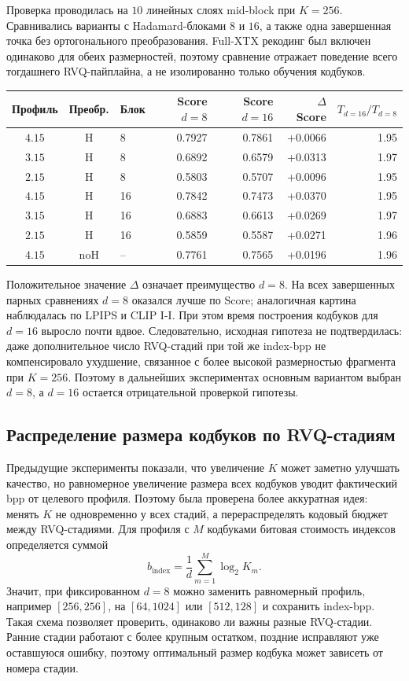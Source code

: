 \documentclass[a4paper,12pt]{article}
\begin{document}
Проверка проводилась на $10$ линейных слоях mid-block при $K=256$. Сравнивались варианты с Hadamard-блоками $8$ и $16$, а также одна завершенная точка без ортогонального преобразования. Full-XTX рекодинг был включен одинаково для обеих размерностей, поэтому сравнение отражает поведение всего тогдашнего RVQ-пайплайна, а не изолированно только обучения кодбуков.

\begin{center}
\small
\begin{tabular}{cclrrrr}
\hline
Профиль & Преобр. & Блок & Score $d=8$ & Score $d=16$ & $\Delta$ Score & $T_{d=16}/T_{d=8}$ \\
\hline
$4.15$ & H & 8  & 0.7927 & 0.7861 & +0.0066 & 1.95 \\
$3.15$ & H & 8  & 0.6892 & 0.6579 & +0.0313 & 1.97 \\
$2.15$ & H & 8  & 0.5803 & 0.5707 & +0.0096 & 1.95 \\
$4.15$ & H & 16 & 0.7842 & 0.7473 & +0.0370 & 1.95 \\
$3.15$ & H & 16 & 0.6883 & 0.6613 & +0.0269 & 1.97 \\
$2.15$ & H & 16 & 0.5859 & 0.5587 & +0.0271 & 1.96 \\
$4.15$ & noH & -- & 0.7761 & 0.7565 & +0.0196 & 1.96 \\
\hline
\end{tabular}
\end{center}

Положительное значение $\Delta$ означает преимущество $d=8$. На всех завершенных парных сравнениях $d=8$ оказался лучше по Score; аналогичная картина наблюдалась по LPIPS и CLIP I-I. При этом время построения кодбуков для $d=16$ выросло почти вдвое. Следовательно, исходная гипотеза не подтвердилась: даже дополнительное число RVQ-стадий при той же index-bpp не компенсировало ухудшение, связанное с более высокой размерностью фрагмента при $K=256$. Поэтому в дальнейших экспериментах основным вариантом выбран $d=8$, а $d=16$ остается отрицательной проверкой гипотезы.

\subsection{Распределение размера кодбуков по RVQ-стадиям}

Предыдущие эксперименты показали, что увеличение $K$ может заметно улучшать качество, но равномерное увеличение размера всех кодбуков уводит фактический bpp от целевого профиля. Поэтому была проверена более аккуратная идея: менять $K$ не одновременно у всех стадий, а перераспределять кодовый бюджет между RVQ-стадиями. Для профиля с $M$ кодбуками битовая стоимость индексов определяется суммой
\[
    b_{\mathrm{index}}
    =
    \frac{1}{d}\sum_{m=1}^{M}\log_2 K_m.
\]
Значит, при фиксированном $d=8$ можно заменить равномерный профиль, например $[256,256]$, на $[64,1024]$ или $[512,128]$ и сохранить index-bpp. Такая схема позволяет проверить, одинаково ли важны разные RVQ-стадии. Ранние стадии работают с более крупным остатком, поздние исправляют уже оставшуюся ошибку, поэтому оптимальный размер кодбука может зависеть от номера стадии.
\end{document}
